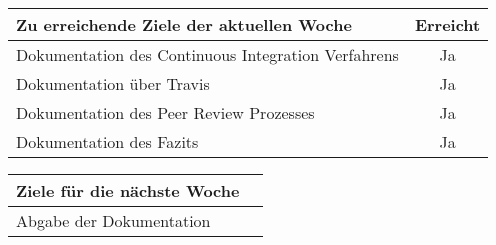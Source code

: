 \begin{tabularx}{\textwidth}{Xc}
    \arrayrulecolor{OliveGreen}
    \toprule
    {\bfseries Zu erreichende Ziele der aktuellen Woche} & {\bfseries Erreicht} \\
    \midrule[2pt]
    Dokumentation des Continuous Integration Verfahrens  &Ja                    \\
    \rowcolor{OliveGreen!15}
    Dokumentation über Travis                            &Ja                    \\
    \rowcolor{White}
    Dokumentation des Peer Review Prozesses              &Ja                    \\
    \rowcolor{OliveGreen!15}
    Dokumentation des Fazits                             &Ja                    \\
    \bottomrule[2pt]
\end{tabularx}
%
\vspace{1cm}
%
\begin{tabularx}{\textwidth}{Xc}
    \arrayrulecolor{OliveGreen}
    \toprule
    {\bfseries Ziele für die nächste Woche}              &                      \\
    \midrule[2pt]
    Abgabe der Dokumentation                             &                      \\
\end{tabularx}
